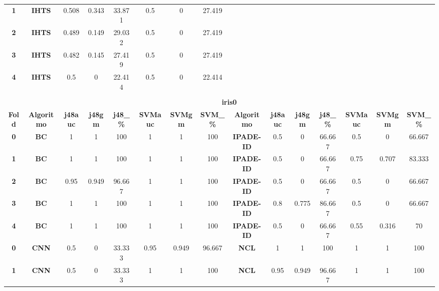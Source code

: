 {{\begin{tabular}{c|c|cccccc|ccccccc}
\textbf{1} & \textbf{IHTS} & 0.508 & 0.343 & 33.871 & 0.5   & 0     & 27.419 &       &       &       &       &       &       &  \\
\textbf{2} & \textbf{IHTS} & 0.489 & 0.149 & 29.032 & 0.5   & 0     & 27.419 &       &       &       &       &       &       &  \\
\textbf{3} & \textbf{IHTS} & 0.482 & 0.145 & 27.419 & 0.5   & 0     & 27.419 &       &       &       &       &       &       &  \\
\textbf{4} & \textbf{IHTS} & 0.5   & 0     & 22.414 & 0.5   & 0     & 22.414 &       &       &       &       &       &       &  \\
\multicolumn{1}{c}{} & \multicolumn{1}{c}{} &       &       &       &       &       & \multicolumn{1}{c}{} &       &       &       &       &       &       &  \\
\multicolumn{1}{c}{} & \multicolumn{14}{c}{\textbf{iris0}} \\
\midrule
\textbf{Fold} & \textbf{Algoritmo} & \textbf{j48auc} & \textbf{j48gm} & \textbf{j48\_\%} & \textbf{SVMauc} & \textbf{SVMgm} & \textbf{SVM\_\%} & \multicolumn{1}{c|}{\textbf{Algoritmo}} & \textbf{j48auc} & \textbf{j48gm} & \textbf{j48\_\%} & \textbf{SVMauc} & \textbf{SVMgm} & \textbf{SVM\_\%} \\
\midrule
\textbf{0} & \textbf{BC} & 1     & 1     & 100   & 1     & 1     & 100   & \multicolumn{1}{c|}{\textbf{IPADE-ID}} & 0.5   & 0     & 66.667 & 0.5   & 0     & 66.667 \\
\textbf{1} & \textbf{BC} & 1     & 1     & 100   & 1     & 1     & 100   & \multicolumn{1}{c|}{\textbf{IPADE-ID}} & 0.5   & 0     & 66.667 & 0.75  & 0.707 & 83.333 \\
\textbf{2} & \textbf{BC} & 0.95  & 0.949 & 96.667 & 1     & 1     & 100   & \multicolumn{1}{c|}{\textbf{IPADE-ID}} & 0.5   & 0     & 66.667 & 0.5   & 0     & 66.667 \\
\textbf{3} & \textbf{BC} & 1     & 1     & 100   & 1     & 1     & 100   & \multicolumn{1}{c|}{\textbf{IPADE-ID}} & 0.8   & 0.775 & 86.667 & 0.5   & 0     & 66.667 \\
\textbf{4} & \textbf{BC} & 1     & 1     & 100   & 1     & 1     & 100   & \multicolumn{1}{c|}{\textbf{IPADE-ID}} & 0.5   & 0     & 66.667 & 0.55  & 0.316 & 70 \\
\textbf{0} & \textbf{CNN} & 0.5   & 0     & 33.333 & 0.95  & 0.949 & 96.667 & \multicolumn{1}{c|}{\textbf{NCL}} & 1     & 1     & 100   & 1     & 1     & 100 \\
\textbf{1} & \textbf{CNN} & 0.5   & 0     & 33.333 & 1     & 1     & 100   & \multicolumn{1}{c|}{\textbf{NCL}} & 0.95  & 0.949 & 96.667 & 1     & 1     & 100 \\

\end{tabular}}}
